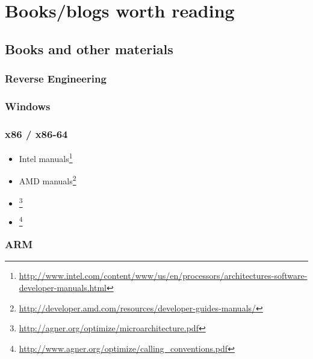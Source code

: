 \part{Books/blogs worth reading}

\chapter{Books and other materials}

\section{Reverse Engineering}



\section{Windows}



\section{\CCpp}



\section{x86 / x86-64}

\label{x86_manuals}
\begin{itemize}
\item Intel manuals\footnote{\AlsoAvailableAs \url{http://www.intel.com/content/www/us/en/processors/architectures-software-developer-manuals.html}}

\item AMD manuals\footnote{\AlsoAvailableAs \url{http://developer.amd.com/resources/developer-guides-manuals/}}

\item \AgnerFog{}\footnote{\AlsoAvailableAs \url{http://agner.org/optimize/microarchitecture.pdf}}

\item \AgnerFogCC{}\footnote{\AlsoAvailableAs \url{http://www.agner.org/optimize/calling_conventions.pdf}}
\end{itemize}

\section{ARM}

